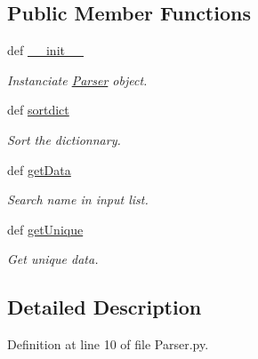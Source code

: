 \subsection*{\-Public \-Member \-Functions}
\begin{DoxyCompactItemize}
\item 
def \hyperlink{classirna_1_1iRNA__stat_1_1Parser_1_1Parser_a917eb7cc5b0c8c08810fef6927adf9b7}{\-\_\-\-\_\-init\-\_\-\-\_\-}
\begin{DoxyCompactList}\small\item\em \-Instanciate \hyperlink{classirna_1_1iRNA__stat_1_1Parser_1_1Parser}{\-Parser} object. \end{DoxyCompactList}\item 
def \hyperlink{classirna_1_1iRNA__stat_1_1Parser_1_1Parser_a2b844d5bde2df1ec338cd6daf95c454a}{sortdict}
\begin{DoxyCompactList}\small\item\em \-Sort the dictionnary. \end{DoxyCompactList}\item 
def \hyperlink{classirna_1_1iRNA__stat_1_1Parser_1_1Parser_a557c9b33930b403ef47fc6b31c4fee14}{get\-Data}
\begin{DoxyCompactList}\small\item\em \-Search name in input list. \end{DoxyCompactList}\item 
def \hyperlink{classirna_1_1iRNA__stat_1_1Parser_1_1Parser_aa9f6aac47d63d983d5c23d50999a3137}{get\-Unique}
\begin{DoxyCompactList}\small\item\em \-Get unique data. \end{DoxyCompactList}\end{DoxyCompactItemize}


\subsection{\-Detailed \-Description}


\-Definition at line 10 of file \-Parser.\-py.



